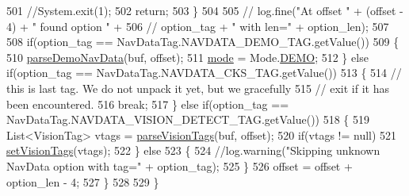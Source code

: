 \begin{DoxyCode}
501                 \textcolor{comment}{//System.exit(1);}
502                 \textcolor{keywordflow}{return};
503             \}
504 
505             \textcolor{comment}{// log.fine("At offset " + (offset - 4) + " found option " +}
506             \textcolor{comment}{// option\_tag + " with len=" + option\_len);}
507 
508             \textcolor{keywordflow}{if}(option\_tag == NavDataTag.NAVDATA\_DEMO\_TAG.getValue())
509             \{
510                 \hyperlink{classworkspace_1_1_a_r_drone_nav_data_1_1src_1_1controller_1_1_drone_test_a92cb230a2831894de2a16fcd699223d1}{parseDemoNavData}(buf, offset);
511                 \hyperlink{classworkspace_1_1_a_r_drone_nav_data_1_1src_1_1controller_1_1_drone_test_a2a8ad2faa7de6fe34059387c6203324b}{mode} = Mode.\hyperlink{enumworkspace_1_1_a_r_drone_nav_data_1_1src_1_1controller_1_1_mode_a09071332c54725b55b8f88c41ec504d1}{DEMO};
512             \} \textcolor{keywordflow}{else} \textcolor{keywordflow}{if}(option\_tag == NavDataTag.NAVDATA\_CKS\_TAG.getValue())
513             \{
514                 \textcolor{comment}{// this is last tag. We do not unpack it yet, but we gracefully}
515                 \textcolor{comment}{// exit if it has been encountered.}
516                 \textcolor{keywordflow}{break};
517             \} \textcolor{keywordflow}{else} \textcolor{keywordflow}{if}(option\_tag == NavDataTag.NAVDATA\_VISION\_DETECT\_TAG.getValue())
518             \{
519                 List<VisionTag> vtags = \hyperlink{classworkspace_1_1_a_r_drone_nav_data_1_1src_1_1controller_1_1_drone_test_a7a8567c51fce8694416352403125f692}{parseVisionTags}(buf, offset);
520                 \textcolor{keywordflow}{if}(vtags != null)
521                     \hyperlink{classworkspace_1_1_a_r_drone_nav_data_1_1src_1_1controller_1_1_drone_test_a01db93bd212a1ebc82844f01922f8284}{setVisionTags}(vtags);
522             \} \textcolor{keywordflow}{else}
523             \{
524                 \textcolor{comment}{//log.warning("Skipping unknown NavData option with tag=" + option\_tag);}
525             \}
526             offset = offset + option\_len - 4;
527         \}
528 
529     \}
\end{DoxyCode}



